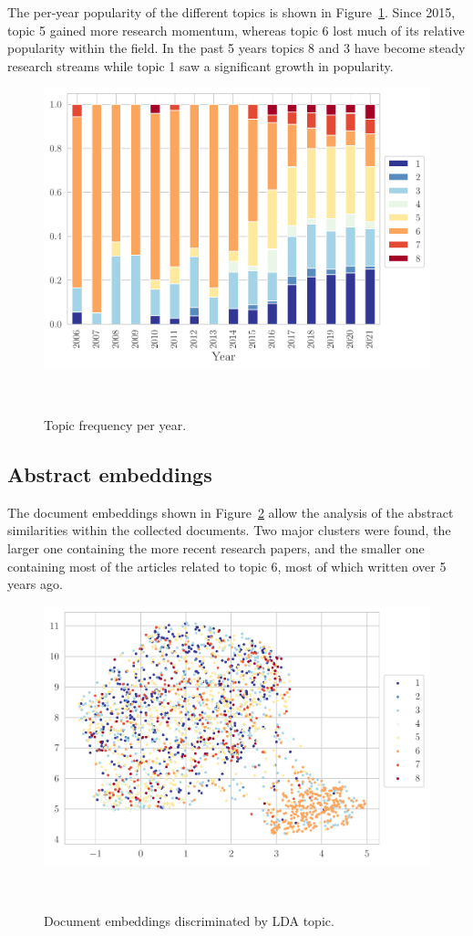 \documentclass[parskip=full]{scrartcl}
\begin{document}
The per-year popularity of the different topics is shown in
Figure~\ref{fig:topics_per_year}. Since 2015, topic 5 gained more research
momentum, whereas topic 6 lost much of its relative popularity within the
field. In the past 5 years topics 8 and 3 have become steady research streams
while topic 1 saw a significant growth in popularity. 

\begin{figure}[H]
	\centering
    \includegraphics[width=\linewidth]{../analysis/topics_per_year}
    \caption{Topic frequency per year.
    }~\label{fig:topics_per_year}
\end{figure}

\subsection{Abstract embeddings}

The document embeddings shown in Figure~\ref{fig:umap_lda_topics} allow the
analysis of the abstract similarities within the collected documents. Two
major clusters were found, the larger one containing the more recent research
papers, and the smaller one containing most of the articles related to topic
6, most of which written over 5 years ago. 

\begin{figure}[H]
	\centering
    \includegraphics[width=\linewidth]{../analysis/umap_lda_topics}
    \caption{Document embeddings discriminated by LDA topic.
    }~\label{fig:umap_lda_topics}
\end{figure}
\end{document}
